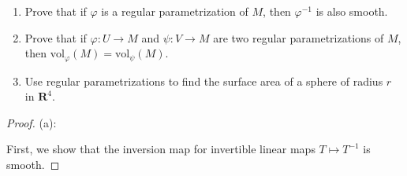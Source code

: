 \documentclass{article}
\newcommand{\R}{\mathbf{R}}
\newcommand{\vol}{\mathrm{vol}}
\theoremstyle{plain} %
\numberwithin{thm}{section} %
\theoremstyle{definition}
\begin{document}
        \begin{enumerate}[label=(\alph*)]
            \item Prove that if $\varphi$ is a regular parametrization of $M$, then $\varphi^{-1}$ is also smooth.
            
            \item Prove that if $\varphi:U\rightarrow M$ and $\psi:V\rightarrow M$ are two regular parametrizations of $M$, then $\vol_\varphi(M)=\vol_\psi(M)$.
    
            \item Use regular parametrizations to find the surface area of a sphere of radius $r$ in $\R^4$.
        \end{enumerate}
        \begin{proof}
            (a):

    First, we show that the inversion map for invertible linear maps \(T \mapsto T^{-1}\) is smooth.


\end{proof}
\end{document}
